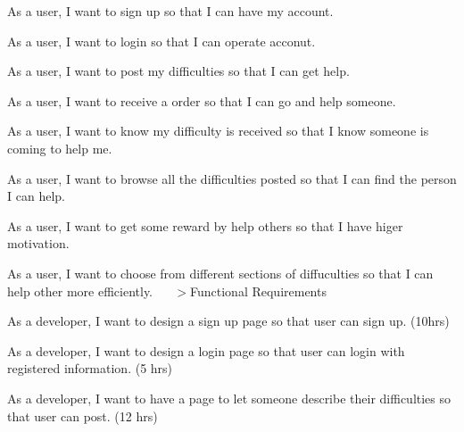 \begin{DoxyEnumerate}
\item As a user, I want to sign up so that I can have my account. ~\newline

\item As a user, I want to login so that I can operate acconut. ~\newline

\item As a user, I want to post my difficulties so that I can get help. ~\newline

\item As a user, I want to receive a order so that I can go and help someone. ~\newline

\item As a user, I want to know my difficulty is received so that I know someone is coming to help me. ~\newline

\item As a user, I want to browse all the difficulties posted so that I can find the person I can help.~\newline

\item As a user, I want to get some reward by help others so that I have higer motivation.~\newline

\item As a user, I want to choose from different sections of diffuculties so that I can help other more efficiently.~\newline
 ~\newline
 $>$Functional Requirements~\newline

\item As a developer, I want to design a sign up page so that user can sign up. (10hrs)~\newline

\item As a developer, I want to design a login page so that user can login with registered information. (5 hrs)~\newline

\item As a developer, I want to have a page to let someone describe their difficulties so that user can post. (12 hrs)~\newline


\end{DoxyEnumerate}
